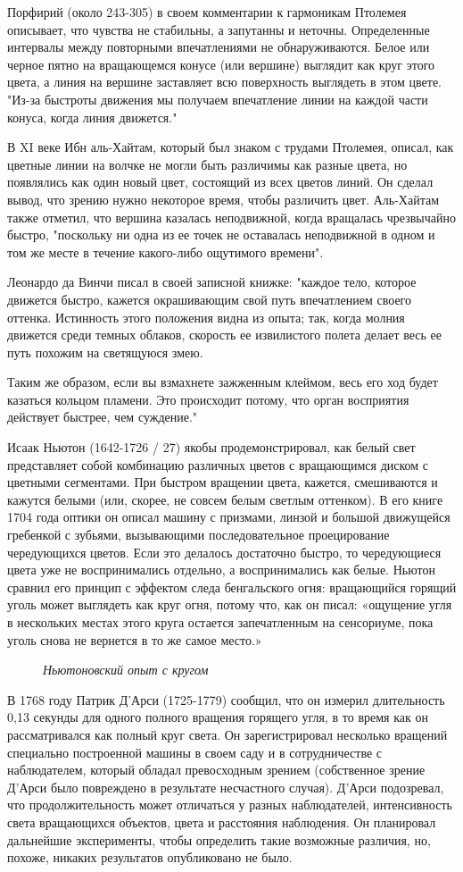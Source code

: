 \documentclass[a4paper, 12pt]{article}
\newcommand{\image}[3]{
	\begin{figure}[ht]
		\center{\texttt{[image: img/\#1]} }
		\caption{\textit{#3}}\end{figure}
}
\begin{document}
Порфирий (около 243-305) в своем комментарии к гармоникам
Птолемея описывает, что чувства не стабильны, а запутанны и неточны.
Определенные интервалы между повторными впечатлениями не
обнаруживаются. Белое или черное пятно на вращающемся конусе (или
вершине) выглядит как круг этого цвета, а линия на вершине
заставляет всю поверхность выглядеть в этом цвете. "Из-за быстроты
движения мы получаем впечатление линии на каждой части конуса,
когда линия движется."

В XI веке Ибн аль-Хайтам, который был знаком с трудами
Птолемея, описал, как цветные линии на волчке не могли быть
различимы как разные цвета, но появлялись как один новый цвет,
состоящий из всех цветов линий. Он сделал вывод, что зрению нужно
некоторое время, чтобы различить цвет. Аль-Хайтам также отметил,
что вершина казалась неподвижной, когда вращалась чрезвычайно
быстро, "поскольку ни одна из ее точек не оставалась неподвижной в
одном и том же месте в течение какого-либо ощутимого времени".

Леонардо да Винчи писал в своей записной книжке: "каждое тело,
которое движется быстро, кажется окрашивающим свой путь
впечатлением своего оттенка. Истинность этого положения видна из
опыта; так, когда молния движется среди темных облаков, скорость ее
извилистого полета делает весь ее путь похожим на светящуюся змею.

Таким же образом, если вы взмахнете зажженным клеймом, весь его
ход будет казаться кольцом пламени. Это происходит потому, что
орган восприятия действует быстрее, чем суждение."

Исаак Ньютон (1642-1726 / 27) якобы продемонстрировал, как
белый свет представляет собой комбинацию различных цветов с
вращающимся диском с цветными сегментами. При быстром вращении
цвета, кажется, смешиваются и кажутся белыми (или, скорее, не
совсем белым светлым оттенком). В его книге 1704 года оптики он
описал машину с призмами, линзой и большой движущейся гребенкой с
зубьями, вызывающими последовательное проецирование
чередующихся цветов. Если это делалось достаточно быстро, то
чередующиеся цвета уже не воспринимались отдельно, а
воспринимались как белые. Ньютон сравнил его принцип с эффектом
следа бенгальского огня: вращающийся горящий уголь может
выглядеть как круг огня, потому что, как он писал: «ощущение угля в
нескольких местах этого круга остается запечатленным на сенсориуме,
пока уголь снова не вернется в то же самое место.»

\image{круг.png}{200}{Ньютоновский опыт с кругом}
В 1768 году Патрик Д'Арси (1725-1779) сообщил, что он измерил
длительность 0,13 секунды для одного полного вращения горящего
угля, в то время как он рассматривался как полный круг света. Он
зарегистрировал несколько вращений специально построенной машины
в своем саду и в сотрудничестве с наблюдателем, который обладал
превосходным зрением (собственное зрение Д'Арси было повреждено в
результате несчастного случая). Д'Арси подозревал, что
продолжительность может отличаться у разных наблюдателей,
интенсивность света вращающихся объектов, цвета и расстояния
наблюдения. Он планировал дальнейшие эксперименты, чтобы
определить такие возможные различия, но, похоже, никаких
результатов опубликовано не было.
\end{document}
